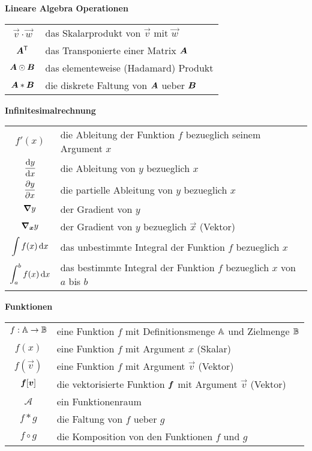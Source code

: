 \begin{center}\textbf{Lineare Algebra Operationen}\end{center}
\begin{tabular}{cl}
  $\vec{v} \cdot \vec{w}$ & das Skalarprodukt von $\vec{v}$ mit $\vec{w}$ \\
  $\bm{A}^{\mathsf{T}}$ & das Transponierte einer Matrix $\bm{A}$ \\
  $\bm{A} \odot \bm{B}$ & das elementeweise (Hadamard) Produkt \\
  $\bm{A} * \bm{B}$ & die diskrete Faltung von $\bm{A}$ ueber $\bm{B}$

\end{tabular}

\begin{center}\textbf{Infinitesimalrechnung}\end{center}
\begin{tabular}{cl}
  $f'(x)$ & die Ableitung der Funktion $f$ bezueglich seinem Argument $x$ \\
  $\displaystyle\frac{\text{d}y}{\text{d}x}$ & die Ableitung von $y$ bezueglich $x$ \\[2ex]
  $\displaystyle\frac{\partial y}{\partial x}$ & die partielle Ableitung von $y$ bezueglich $x$ \\[2ex]
  $\bm{\nabla} y$ & der Gradient von $y$\\
  $\bm{\nabla}_{\bm{x}}y$ & der Gradient von $y$ bezueglich $\vec{x}$ (Vektor) \\
  $\displaystyle\int f(x)\,\text{d}x$ & das unbestimmte Integral der Funktion $f$ bezueglich $x$ \\
  $\displaystyle\int_a^b f(x)\,\text{d}x$ & das bestimmte Integral der Funktion $f$ bezueglich $x$ von $a$ bis $b$ \\

\end{tabular}

\begin{center}\textbf{Funktionen}\end{center}
\begin{tabular}{cl}
  $f: \mathbb{A} \to \mathbb{B}$ & eine Funktion $f$ mit Definitionsmenge $\mathbb{A}$ und Zielmenge $\mathbb{B}$ \\
  $f(x)$ & eine Funktion $f$ mit Argument $x$ (Skalar) \\
  $f(\vec{v})$ & eine Funktion $f$ mit Argument $\vec{v}$ (Vektor) \\
  $\bm{f}[\bm{v}]$ & die vektorisierte Funktion $\bm{f}$ mit Argument $\vec{v}$ (Vektor) \\
  $\mathcal{A}$ & ein Funktionenraum \\
  $f * g$ & die Faltung von $f$ ueber $g$ \\
  $f \circ g$ & die Komposition von den Funktionen $f$ und $g$ \\

\end{tabular}

